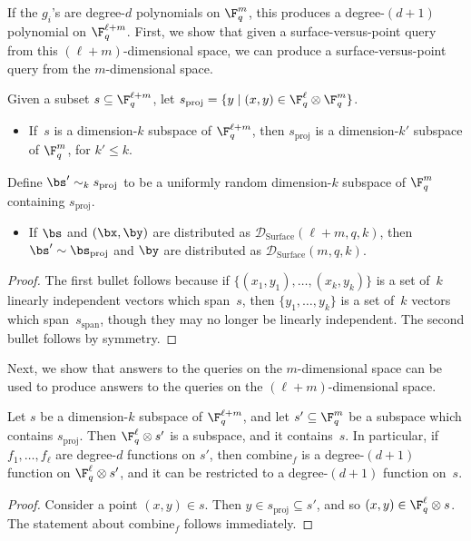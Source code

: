 If the $g_i$'s are degree-$d$ polynomials on $\F_q^m$, this produces a degree-$(d+1)$ polynomial on $\F_q^{\ell + m}$.
First, we show that given a surface-versus-point query from this $(\ell + m)$-dimensional space,
we can produce a surface-versus-point query from the $m$-dimensional space.

\begin{proposition}\label{prop:really-the-same-dist}
Given a subset $s \subseteq \F_q^{\ell + m}$, let $s_{\mathrm{proj}} = \{y \mid (x, y) \in \F_q^{\ell} \otimes \F_q^m\}$.
\begin{itemize}
\item[$\circ$] If~$s$ is a dimension-$k$ subspace of $\F_q^{\ell+m}$, then $s_{\mathrm{proj}}$ is a dimension-$k'$ subspace of $\F_q^{m}$, for $k' \leq k$.
\end{itemize}
Define $\bs' \sim_k s_{\mathrm{proj}}$ to be a uniformly random dimension-$k$ subspace of $\F_q^{m}$ containing $s_{\mathrm{proj}}$.
\begin{itemize}
\item[$\circ$] If $\bs$ and $(\bx, \by)$ are distributed as $\mathscr{D}_{\mathrm{Surface}}(\ell + m,q,k)$,
		then $\bs' \sim \bs_{\mathrm{proj}}$ and $\by$ are distributed as $\mathscr{D}_{\mathrm{Surface}}(m, q, k)$.
\end{itemize}
\end{proposition}
\begin{proof}
The first bullet follows because if $\{(x_1, y_1), \ldots, (x_k, y_k)\}$ is a set of~$k$ linearly independent vectors which span~$s$,
then $\{y_1, \ldots, y_k\}$ is a set of~$k$ vectors which span~$s_{\mathrm{span}}$, though they may no longer be linearly independent.
The second bullet follows by symmetry.
\end{proof}

Next, we show that answers to the queries on the $m$-dimensional space
can be used to produce answers to the queries on the $(\ell+m)$-dimensional space.

\begin{proposition}\label{prop:sub-subspace}
Let $s$ be a dimension-$k$ subspace of $\F_q^{\ell + m}$, and let $s' \subseteq \F_q^{m}$ be a subspace which contains $s_{\mathrm{proj}}$.
Then $\F_q^\ell \otimes s'$ is a subspace, and it contains~$s$.
In particular, if $f_1, \ldots, f_\ell$ are degree-$d$ functions on $s'$, then $\mathrm{combine}_f$ is a degree-$(d+1)$ function on $\F_q^\ell \otimes s'$,
and it can be restricted to a degree-$(d+1)$ function on~$s$.
\end{proposition}
\begin{proof}
Consider a point $(x, y) \in s$. Then $y \in s_{\mathrm{proj}} \subseteq s'$, and so $(x, y) \in \F_q^{\ell} \otimes s$.
The statement about $\mathrm{combine}_f$ follows immediately.
\end{proof}

